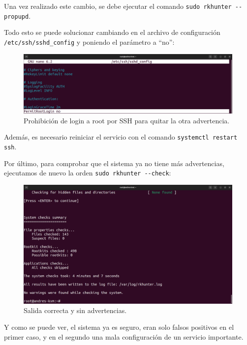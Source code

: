 \documentclass{article}
\begin{document}
Una vez realizado este cambio, se debe ejecutar el comando \verb|sudo rkhunter --propupd|.


Todo esto se puede solucionar cambiando en el archivo de configuración \verb|/etc/ssh/sshd_config| y poniendo el parámetro a ``no'':

\begin{figure}[H]
    \includegraphics[width=\textwidth]{imagenes/sshpermit.png}
    \caption{Prohibición de login a root por SSH para quitar la otra advertencia.}
\end{figure}

\newpage

Además, es necesario reiniciar el servicio con el comando \verb|systemctl restart ssh|.

Por último, para comprobar que el sistema ya no tiene más advertencias, ejecutamos de nuevo la orden \verb|sudo rkhunter --check|:

\begin{figure}[H]
    \includegraphics[width=\textwidth]{imagenes/rkhunterokk.png}
    \caption{Salida correcta y sin advertencias.}
\end{figure}

Y como se puede ver, el sistema ya es seguro, eran solo falsos positivos en el primer caso, y en el segundo una mala configuración de un servicio importante.
\end{document}
